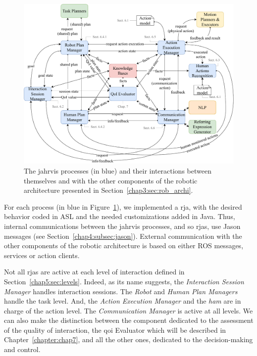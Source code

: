 \documentclass[a4paper,11pt,twoside]{StyleThese}
\begin{document}
\begin{figure}[!ht]
	\includegraphics[width=\linewidth]{figures/chapter2/supervisor_modules.pdf}
	\caption{The \acrshort{jahrvis} processes (in blue) and their interactions between themselves and with the other components of the robotic architecture presented in Section~\ref{chap3:sec:rob_archi}.}
	\label{chap5:fig:sup_overview}
\end{figure}

For each process (in blue in Figure~\ref{chap5:fig:sup_overview}), we implemented a \acrfull{rja}, with the desired behavior coded in ASL and the needed customizations added in Java. Thus, internal communications between the \acrshort{jahrvis} processes, and so \acrshort{rja}s, use Jason messages (see Section~\ref{chap4:subsec:jason}). External communication with the other components of the robotic architecture is based on either ROS messages, services or action clients.

Not all \acrshort{rja}s are active at each level of interaction defined in Section~\ref{chap5:sec:levels}. Indeed, as its name suggests, the \textit{Interaction Session Manager} handles interaction sessions. The \textit{Robot} and \textit{Human Plan Managers} handle the task level. And, the \textit{Action Execution Manager} and the \textit{\acrlong{ham}} are in charge of the action level. The \textit{Communication Manager} is active at all levels. We can also make the distinction between the component dedicated to the assessment of the quality of interaction, \ie the \acrshort{qoi} Evaluator which will be described in Chapter~\ref{chapter:chap7}, and all the other ones, dedicated to the decision-making and control.
\end{document}
